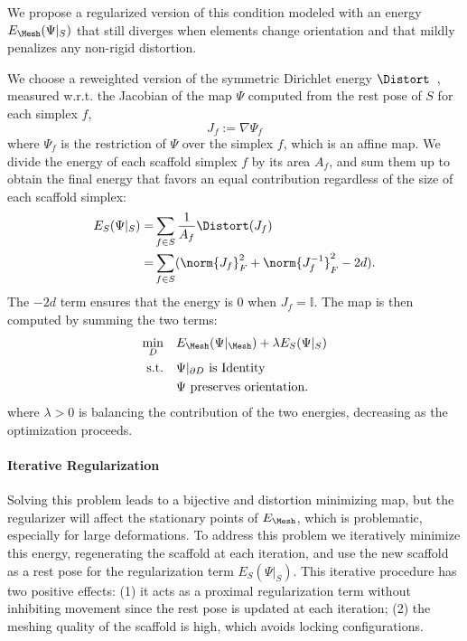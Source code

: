  We propose a regularized version of this condition modeled with an energy $E_{\Mesh} (\Psi|_{S})$ that still diverges when elements change orientation and that mildly penalizes any non-rigid distortion.
 
 We choose a reweighted version of the symmetric Dirichlet energy $\Distort$~\cite{Smith:2015}, measured w.r.t. the Jacobian of the map $\Psi$ computed from the rest pose of $S$ for each simplex $f$,
\begin{equation}
    J_f := \nabla \Psi_f
\end{equation}
where $\Psi_f$ is the restriction of $\Psi$ over the simplex $f$, which is an affine map. We divide the energy of each scaffold simplex $f$ by its area $A_f$, and sum them up to obtain the final energy that favors an equal contribution regardless of the size of each scaffold simplex:
\begin{align}
    \begin{split}
    E_S(\Psi|_{S}) =&\sum_{f\in S} \frac{1}{A_f} \Distort(J_f) \\
    =&\sum_{f\in S} (\norm{J_f}_F^2 + \norm{J^{-1}_f}_F^2 -2d).
    \end{split}
\end{align}
The $-2d$ term ensures that the energy is 0 when $J_f = \mathbb{I}$. The map is then computed by summing the two terms:
\begin{align}
\begin{split}\label{eq:variational}
\min_{D} & \quad E_{\Mesh}(\Psi|_{\Mesh}) + \lambda E_{S} (\Psi|_{S}) \\
    \text{s.t.} & \quad \Psi|_{\partial D} \revise{\text{ is Identity}} \\ 
    & \quad \Psi \text{ preserves orientation}.
\end{split}
\end{align}
where $\lambda > 0$ is balancing the contribution of the two energies, decreasing as the optimization proceeds.

\paragraph{Iterative Regularization}
Solving this problem leads to a bijective and distortion minimizing map, but the regularizer will affect the stationary points of $E_{\Mesh}$, which is problematic, especially for large deformations.
%
To address this problem we iteratively minimize this energy, regenerating the scaffold at each iteration, and use the new scaffold as a rest pose for the regularization term $E_{S} (\Psi|_{S})$. This iterative procedure has two positive effects: (1) it acts as a proximal regularization term without inhibiting movement since the rest pose is updated at each iteration; (2) the meshing quality of the scaffold is high, which avoids locking configurations.

